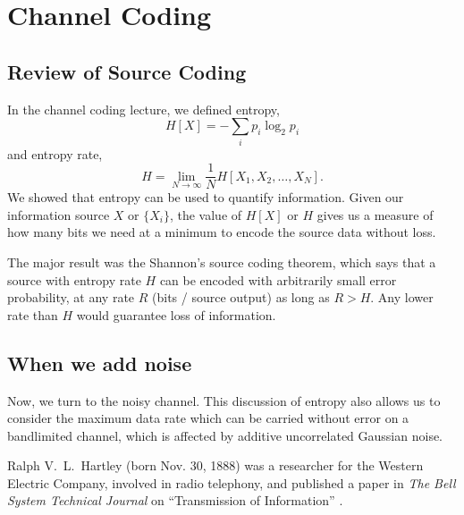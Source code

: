 



\section{Channel Coding}


\subsection{Review of Source Coding}

In the channel coding lecture, we defined entropy,
\[
  H[X] = -\sum_i p_i \log_2 p_i
\]
and entropy rate,
\[
  H = \lim_{N\rightarrow \infty} \frac{1}{N} H[X_1, X_2, \ldots, X_N].
\]
We showed that entropy can be used to quantify information. Given
our information source $X$ or $\{X_i\}$, the value of $H[X]$ or $H$
gives us a measure of how many bits we need at a minimum to encode the source data without loss.

The major result was the Shannon's source coding theorem, which says
that a source with entropy rate $H$ can be encoded with arbitrarily
small error probability, at any rate $R$ (bits / source output) as
long as $R>H$.  Any lower rate than $H$ would guarantee loss of
information.

\subsection{When we add noise}

Now, we turn to the noisy channel.  This discussion of entropy also allows us to consider the maximum data rate which can be carried without error on a bandlimited channel, which is affected by
additive uncorrelated Gaussian noise.

Ralph V.\ L.\ Hartley (born Nov. 30, 1888) was a researcher for the Western Electric Company, involved in radio telephony, and published a paper in \emph{The Bell System Technical Journal} on ``Transmission of Information'' \cite{hartley1928transmission}.

